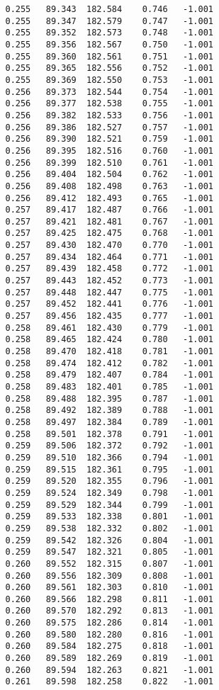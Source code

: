 \begin{verbatim}
   0.255   89.343  182.584    0.746   -1.001
   0.255   89.347  182.579    0.747   -1.001
   0.255   89.352  182.573    0.748   -1.001
   0.255   89.356  182.567    0.750   -1.001
   0.255   89.360  182.561    0.751   -1.001
   0.255   89.365  182.556    0.752   -1.001
   0.255   89.369  182.550    0.753   -1.001
   0.256   89.373  182.544    0.754   -1.001
   0.256   89.377  182.538    0.755   -1.001
   0.256   89.382  182.533    0.756   -1.001
   0.256   89.386  182.527    0.757   -1.001
   0.256   89.390  182.521    0.759   -1.001
   0.256   89.395  182.516    0.760   -1.001
   0.256   89.399  182.510    0.761   -1.001
   0.256   89.404  182.504    0.762   -1.001
   0.256   89.408  182.498    0.763   -1.001
   0.256   89.412  182.493    0.765   -1.001
   0.257   89.417  182.487    0.766   -1.001
   0.257   89.421  182.481    0.767   -1.001
   0.257   89.425  182.475    0.768   -1.001
   0.257   89.430  182.470    0.770   -1.001
   0.257   89.434  182.464    0.771   -1.001
   0.257   89.439  182.458    0.772   -1.001
   0.257   89.443  182.452    0.773   -1.001
   0.257   89.448  182.447    0.775   -1.001
   0.257   89.452  182.441    0.776   -1.001
   0.257   89.456  182.435    0.777   -1.001
   0.258   89.461  182.430    0.779   -1.001
   0.258   89.465  182.424    0.780   -1.001
   0.258   89.470  182.418    0.781   -1.001
   0.258   89.474  182.412    0.782   -1.001
   0.258   89.479  182.407    0.784   -1.001
   0.258   89.483  182.401    0.785   -1.001
   0.258   89.488  182.395    0.787   -1.001
   0.258   89.492  182.389    0.788   -1.001
   0.258   89.497  182.384    0.789   -1.001
   0.258   89.501  182.378    0.791   -1.001
   0.259   89.506  182.372    0.792   -1.001
   0.259   89.510  182.366    0.794   -1.001
   0.259   89.515  182.361    0.795   -1.001
   0.259   89.520  182.355    0.796   -1.001
   0.259   89.524  182.349    0.798   -1.001
   0.259   89.529  182.344    0.799   -1.001
   0.259   89.533  182.338    0.801   -1.001
   0.259   89.538  182.332    0.802   -1.001
   0.259   89.542  182.326    0.804   -1.001
   0.259   89.547  182.321    0.805   -1.001
   0.260   89.552  182.315    0.807   -1.001
   0.260   89.556  182.309    0.808   -1.001
   0.260   89.561  182.303    0.810   -1.001
   0.260   89.566  182.298    0.811   -1.001
   0.260   89.570  182.292    0.813   -1.001
   0.260   89.575  182.286    0.814   -1.001
   0.260   89.580  182.280    0.816   -1.001
   0.260   89.584  182.275    0.818   -1.001
   0.260   89.589  182.269    0.819   -1.001
   0.260   89.594  182.263    0.821   -1.001
   0.261   89.598  182.258    0.822   -1.001

\end{verbatim}
